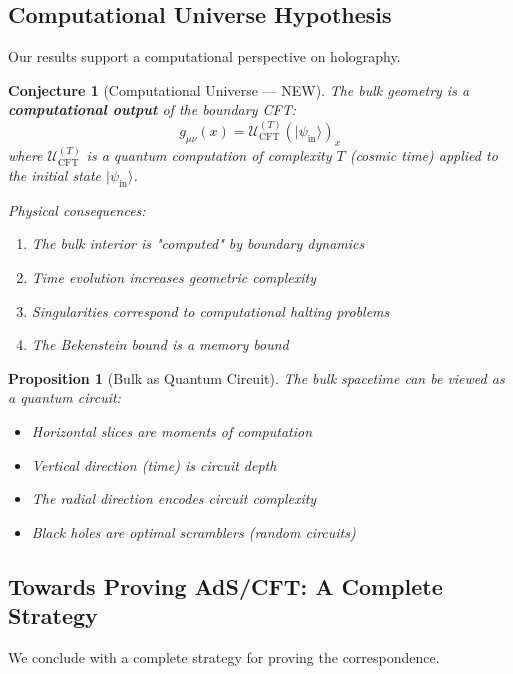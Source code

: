 \documentclass[12pt,a4paper]{article}
\newtheorem{conjecture}[theorem]{Conjecture}
\newtheorem{proposition}[theorem]{Proposition}
\begin{document}
\subsection{Computational Universe Hypothesis}

Our results support a computational perspective on holography.

\begin{conjecture}[Computational Universe --- NEW]
The bulk geometry is a \textbf{computational output} of the boundary CFT:
\begin{equation}
g_{\mu\nu}(x) = \mathcal{U}_{\text{CFT}}^{(T)}(|\psi_{\text{in}}\rangle)_x
\end{equation}
where $\mathcal{U}_{\text{CFT}}^{(T)}$ is a quantum computation of complexity $T$ (cosmic time) applied to the initial state $|\psi_{\text{in}}\rangle$.

Physical consequences:
\begin{enumerate}
    \item The bulk interior is "computed" by boundary dynamics
    \item Time evolution increases geometric complexity
    \item Singularities correspond to computational halting problems
    \item The Bekenstein bound is a memory bound
\end{enumerate}
\end{conjecture}

\begin{proposition}[Bulk as Quantum Circuit]
The bulk spacetime can be viewed as a quantum circuit:
\begin{itemize}
    \item Horizontal slices are moments of computation
    \item Vertical direction (time) is circuit depth
    \item The radial direction encodes circuit complexity
    \item Black holes are optimal scramblers (random circuits)
\end{itemize}
\end{proposition}

\subsection{Towards Proving AdS/CFT: A Complete Strategy}

We conclude with a complete strategy for proving the correspondence.
\end{document}
